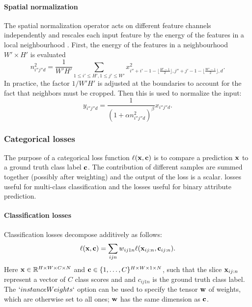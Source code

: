 \paragraph{Spatial normalization}\label{s:spnorm}

The spatial normalization operator acts on different feature channels independently and rescales each input feature by the energy of the features in a local neighbourhood . First, the energy of the features in a neighbourhood $W'\times H'$ is evaluated
\[
n_{i''j''d}^2 = \frac{1}{W'H'}
\sum_{1\leq i' \leq H', 1 \leq j' \leq W'} x^2_{
	i''+i'-1-\lfloor \frac{H'-1}{2}\rfloor,
	j''+j'-1-\lfloor \frac{W'-1}{2}\rfloor,
	d}.
\]
In practice, the factor $1/W'H'$ is adjusted at the boundaries to account for the fact that neighbors must be cropped. Then this is used to normalize the input:
\[
y_{i''j''d} = \frac{1}{(1 + \alpha n_{i''j''d}^2)^\beta} x_{i''j''d}.
\]


\subsubsection{Categorical losses}\label{s:losses}

The purpose of a categorical loss function $\ell(\mathbf{x},\mathbf{c})$ is to compare a prediction $\mathbf{x}$ to a ground truth class label $\mathbf{c}$. The contribution of different samples are summed together (possibly after weighting) and the output of the loss is a scalar.  losses useful for multi-class classification and the  losses useful for binary attribute prediction. 

\paragraph{Classification losses}\label{s:loss-classification}


Classification losses decompose additively as follows:
\begin{equation}\label{e:addloss}
\ell(\mathbf{x},\mathbf{c}) = \sum_{ijn} w_{ij1n} \ell(\mathbf{x}_{ij:n}, \mathbf{c}_{ij:n}).
\end{equation}
Here $\mathbf{x} \in \mathbb{R}^{H \times W \times C \times N}$ and $\mathbf{c} \in \{1, \dots, C\}^{H \times W \times 1 \times N}$, such that the slice $\mathbf{x}_{ij:n}$ represent a vector of $C$ class scores and and $c_{ij1n}$ is the ground truth class label. The $`instanceWeights`$ option can be used to specify the tensor $\mathbf{w}$ of weights, which are otherwise set to all ones; $\mathbf{w}$ has the same dimension as $\mathbf{c}$.


